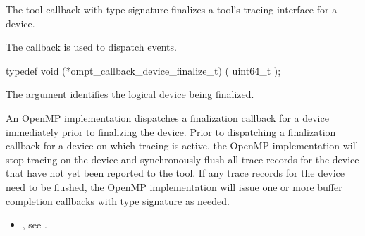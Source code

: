 \summary The tool callback with type signature
 finalizes a
tool's tracing interface for a device.

The  callback is used to dispatch
 events.

\format

\begin{ccppspecific}
\begin{omptCallback}
typedef void (*ompt_callback_device_finalize_t) (
  uint64_t 
);
\end{omptCallback}
\end{ccppspecific}


\argdesc

The argument  identifies the logical device
being finalized.

\descr

An OpenMP implementation dispatches a finalization callback for a
device immediately prior to finalizing the device. Prior to dispatching
a finalization callback for a device on which tracing is active,
the OpenMP implementation will stop tracing on the device and
synchronously flush all trace records for the device 
that have not yet been reported to the tool. 
If any trace records for the device need to be flushed,
the OpenMP implementation will issue one or more
buffer completion callbacks with type signature 
as needed.

\crossreferences
\begin{itemize}
\item {}, see
  .
\end{itemize}
